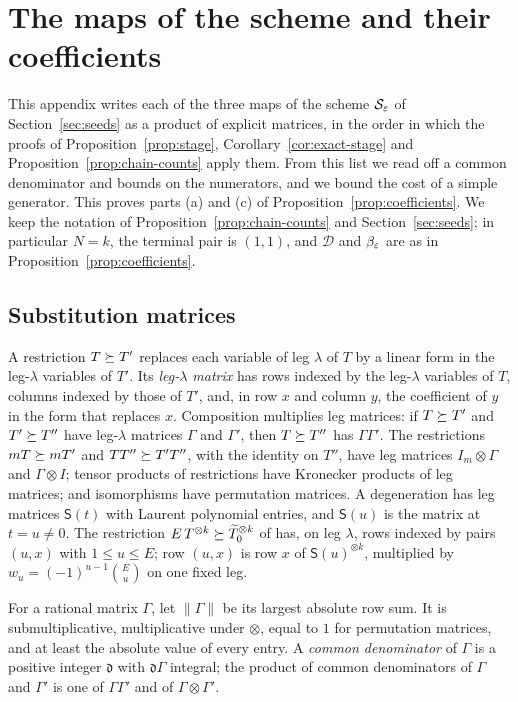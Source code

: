 \section{The maps of the scheme and their coefficients}
\label{sec:coefficients}

This appendix writes each of the three maps of the scheme
\(\mathcal S_\varepsilon\) of Section~\ref{sec:seeds} as a product of explicit
matrices, in the order in which the proofs of
Proposition~\ref{prop:stage}, Corollary~\ref{cor:exact-stage} and
Proposition~\ref{prop:chain-counts} apply them. From this list we read off
a common denominator and bounds on the numerators, and we bound the cost of
a simple generator. This proves parts (a) and (c) of
Proposition~\ref{prop:coefficients}. We keep the notation of
Proposition~\ref{prop:chain-counts} and Section~\ref{sec:seeds}; in
particular \(N=k\), the terminal pair is \((1,1)\), and \(\mathcal D\)
and \(\beta_\varepsilon\) are as in Proposition~\ref{prop:coefficients}.

\subsection{Substitution matrices}
\label{sec:coefficients-matrices}

A restriction \(T\succeq T'\) replaces each variable of leg \(\lambda\) of
\(T\) by a linear form in the leg-\(\lambda\) variables of \(T'\). Its
\emph{leg-\(\lambda\) matrix} has rows indexed by the leg-\(\lambda\)
variables of \(T\), columns indexed by those of \(T'\), and, in row \(x\)
and column \(y\), the coefficient of \(y\) in the form that replaces
\(x\). Composition multiplies leg matrices: if \(T\succeq T'\) and
\(T'\succeq T''\) have leg-\(\lambda\) matrices \(\Gamma\) and
\(\Gamma'\), then \(T\succeq T''\) has \(\Gamma\Gamma'\). The restrictions
\(mT\succeq mT'\) and \(TT''\succeq T'T''\), with the identity on \(T''\),
have leg matrices \(I_m\otimes\Gamma\) and \(\Gamma\otimes I\); tensor
products of restrictions have Kronecker products of leg matrices; and
isomorphisms have permutation matrices. A degeneration has leg matrices
\(\mathsf S(t)\) with Laurent polynomial entries, and \(\mathsf S(u)\) is
the matrix at \(t=u\ne0\). The restriction
\(E\,T^{\otimes k}\succeq\widetilde T_0^{\otimes k}\) of
\citep[Lemma~9.1(c)]{FinCon26} has, on leg \(\lambda\), rows indexed by
pairs \((u,x)\) with \(1\le u\le E\); row \((u,x)\) is row \(x\) of
\(\mathsf S(u)^{\otimes k}\), multiplied by \(w_u=(-1)^{u-1}\binom Eu\) on
one fixed leg.

For a rational matrix \(\Gamma\), let \(\|\Gamma\|\) be its largest
absolute row sum. It is submultiplicative, multiplicative under
\(\otimes\), equal to \(1\) for permutation matrices, and at least the
absolute value of every entry. A \emph{common denominator} of \(\Gamma\)
is a positive integer \(\mathfrak d\) with \(\mathfrak d\Gamma\)
integral; the product of common denominators of \(\Gamma\) and
\(\Gamma'\) is one of \(\Gamma\Gamma'\) and of \(\Gamma\otimes\Gamma'\).

